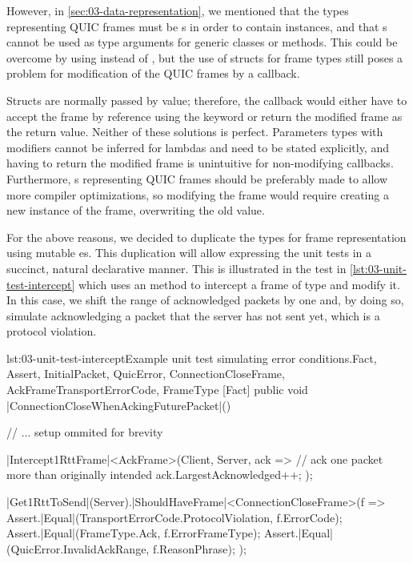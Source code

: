 However, in \autoref{sec:03-data-representation}, we mentioned that the types representing QUIC
frames must be s in order to contain  instances, and that
s cannot be used as type arguments for generic classes or methods. This could be
overcome by using  instead of , but the use of structs for
frame types still poses a problem for modification of the QUIC frames by a callback.

Structs are normally passed by value; therefore, the callback would either have to accept the frame
by reference using the  keyword or return the modified frame as the return value.
Neither of these solutions is perfect. Parameters types with  modifiers cannot be
inferred for lambdas and need to be stated explicitly, and having to return the modified frame is
unintuitive for non-modifying callbacks. Furthermore, s representing QUIC frames
should be preferably made  to allow more compiler optimizations, so modifying the
frame would require creating a new instance of the frame, overwriting the old value.

For the above reasons, we decided to duplicate the types for frame representation using mutable
es. This duplication will allow expressing the unit tests in a succinct, natural
declarative manner. This is illustrated in the test in \autoref{lst:03-unit-test-intercept} which
uses an  method to intercept a frame of type
 and modify it. In this case, we shift the range of acknowledged packets by one and,
by doing so, simulate acknowledging a packet that the server has not sent yet, which is a protocol
violation.

\begin{myListingCsharpNoPageBreak}{lst:03-unit-test-intercept}{Example unit test simulating error conditions.}{Fact, Assert, InitialPacket, QuicError, ConnectionCloseFrame, AckFrame}{TransportErrorCode, FrameType}
    [Fact]
    public void |ConnectionCloseWhenAckingFuturePacket|()
    {
        // ... setup ommited for brevity

        |Intercept1RttFrame|<AckFrame>(Client, Server, ack =>
        {
            // ack one packet more than originally intended
            ack.LargestAcknowledged++;
        });

        |Get1RttToSend|(Server).|ShouldHaveFrame|<ConnectionCloseFrame>(f =>
        {
            Assert.|Equal|(TransportErrorCode.ProtocolViolation, f.ErrorCode);
            Assert.|Equal|(FrameType.Ack, f.ErrorFrameType);
            Assert.|Equal|(QuicError.InvalidAckRange, f.ReasonPhrase);
        });
    }
\end{myListingCsharpNoPageBreak}

